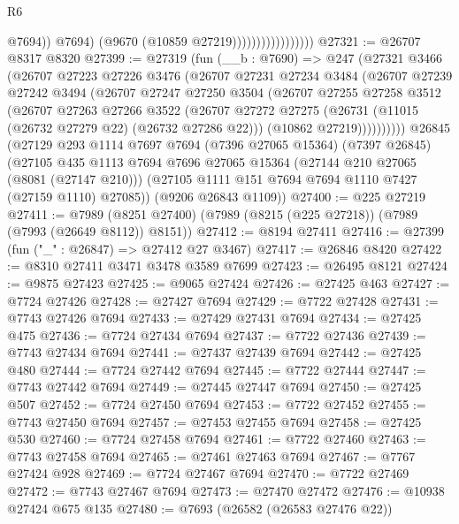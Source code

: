 \begin{lexlean}{R6}
\begin{coremodule}
                                        @7694))
                                    @7694)
                                  (@9670 (@10859 @27219)))))))))))))))))
@27321 := @26707 @8317 @8320
@27399 := @27319
    (fun (__b : @7690) =>
    @247
      (@27321
        @3466
        (@26707
          @27223
          @27226
          @3476
          (@26707
            @27231
            @27234
            @3484
            (@26707
              @27239
              @27242
              @3494
              (@26707
                @27247
                @27250
                @3504
                (@26707
                  @27255
                  @27258
                  @3512
                  (@26707
                    @27263
                    @27266
                    @3522
                    (@26707
                      @27272
                      @27275
                      (@26731 (@11015 (@26732 @27279 @22) (@26732 @27286 @22)))
                      (@10862 @27219))))))))))
    @26845
    (@27129
      @293
      @1114
      @7697
      @7694
      (@7396 @27065 @15364)
      (@7397 @26845)
      (@27105
        @435
        @1113
        @7694
        @7696
        @27065
        @15364
        (@27144 @210 @27065 (@8081 (@27147 @210)))
        (@27105 @1111 @151 @7694 @7694 @1110 @7427 (@27159 @1110) @27085))
      (@9206 @26843 @1109))
@27400 := @225 @27219
@27411 := @7989 (@8251 @27400) (@7989 (@8215 (@225 @27218)) (@7989 (@7993 (@26649 @8112)) @8151))
@27412 := @8194 @27411
@27416 := @27399 (fun ("_" : @26847) => @27412 @27 @3467)
@27417 := @26846 @8420
@27422 := @8310 @27411 @3471 @3478 @3589 @7699
@27423 := @26495 @8121
@27424 := @9875 @27423
@27425 := @9065 @27424
@27426 := @27425 @463
@27427 := @7724 @27426
@27428 := @27427 @7694
@27429 := @7722 @27428
@27431 := @7743 @27426 @7694
@27433 := @27429 @27431 @7694
@27434 := @27425 @475
@27436 := @7724 @27434 @7694
@27437 := @7722 @27436
@27439 := @7743 @27434 @7694
@27441 := @27437 @27439 @7694
@27442 := @27425 @480
@27444 := @7724 @27442 @7694
@27445 := @7722 @27444
@27447 := @7743 @27442 @7694
@27449 := @27445 @27447 @7694
@27450 := @27425 @507
@27452 := @7724 @27450 @7694
@27453 := @7722 @27452
@27455 := @7743 @27450 @7694
@27457 := @27453 @27455 @7694
@27458 := @27425 @530
@27460 := @7724 @27458 @7694
@27461 := @7722 @27460
@27463 := @7743 @27458 @7694
@27465 := @27461 @27463 @7694
@27467 := @7767 @27424 @928
@27469 := @7724 @27467 @7694
@27470 := @7722 @27469
@27472 := @7743 @27467 @7694
@27473 := @27470 @27472
@27476 := @10938 @27424 @675 @135
@27480 := @7693 (@26582 (@26583 @27476 @22))

\end{coremodule}
\end{lexlean}

